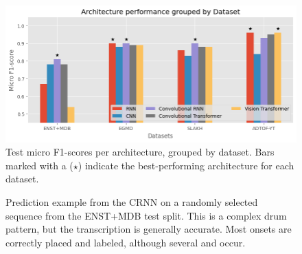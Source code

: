 \begin{figure}[H]
    \centering
    \hspace*{-0.8cm}
    \includegraphics[scale=0.8]{figures/architectureperformancedataset.png}
    \caption{Test micro F1-scores per architecture, grouped by dataset. Bars marked with a ($\star$) indicate the best-performing architecture for each dataset.}
    \label{ArchitectureResultsDatasetFigure}
\end{figure}

\begin{figure}[H]
    \centering
    \caption{Prediction example from the \acrfull{CRNN} on a randomly selected sequence from the ENST+MDB test split. This is a complex drum pattern, but the transcription is generally accurate. Most onsets are correctly placed and labeled, although several  and  occur.}
    \label{ArchitecturePredictionComparisonENST+MDBFigure}
\end{figure}


